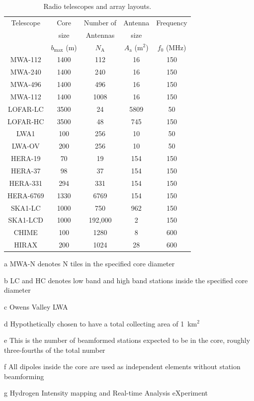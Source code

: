 \documentclass[a4paper,fleqn,usenatbib]{mnras}
\newcommand{\Nant}{N_\textrm{A}}
\begin{document}
\begin{table}
  \scriptsize
  \centering
  \caption{Radio telescopes and array layouts.}
  \label{tab:antenna-layouts}
  \begin{threeparttable}
  \begin{tabular}{ccccc} 
    \hline
    Telescope & Core & Number of & Antenna & Frequency \\
              & size & Antennas & size & \\
              & $b_\textrm{max}$ (m) & $\Nant$ & $A_\textrm{a}$ (m$^2$) & $f_0$ (MHz) \\
    \hline
    MWA-112\tnote{a} & 1400 & 112 & 16 & 150 \\
    MWA-240\tnote{a} & 1400 & 240 & 16 & 150 \\
    MWA-496\tnote{a} & 1400 & 496 & 16 & 150 \\
    MWA-112\tnote{a} & 1400 & 1008 & 16 & 150 \\
    LOFAR-LC\tnote{b} & 3500 & 24 & 5809 & 50 \\
    LOFAR-HC\tnote{b} & 3500 & 48 & 745 & 150 \\
    LWA1 & 100 & 256 & 10 & 50 \\
    LWA-OV\tnote{c} & 200 & 256 & 10 & 50 \\
    HERA-19 & 70 & 19 & 154 & 150 \\
    HERA-37 & 98 & 37 & 154 & 150 \\
    HERA-331 & 294 & 331 & 154 & 150 \\
    HERA-6769\tnote{d} & 1330 & 6769 & 154 & 150 \\
    SKA1-LC\tnote{e} & 1000 & 750 & 962 & 150 \\
    SKA1-LCD\tnote{f} & 1000 & 192,000 & 2 & 150 \\
    CHIME & 100 & 1280 & 8 & 600 \\
    HIRAX\tnote{g} & 200 & 1024 & 28 & 600 \\
    \hline
  \end{tabular}
  \begin{tablenotes}
    \item[a] MWA-N denotes N tiles in the specified core diameter
    \item[b] LC and HC denotes low band and high band stations inside the 
      specified core diameter 
    \item[c] Owens Valley LWA
    \item[d] Hypothetically chosen to have a total collecting area of 
      1~km$^2$
    \item[e] This is the number of beamformed stations expected to be in the 
      core, roughly three-fourths of the total number
    \item[f] All dipoles inside the core are used as independent elements 
      without station beamforming
    \item[g] Hydrogen Intensity mapping and Real-time Analysis eXperiment
  \end{tablenotes}
  \end{threeparttable}
\end{table}
\end{document}
